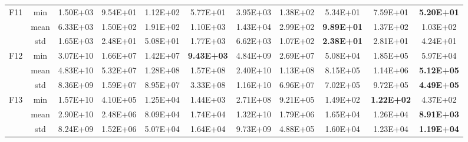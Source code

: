 \documentclass[preprint,review,compress,12pt]{elsarticle}
\begin{document}
\begin{table}[H]
{\begin{tabular}{ccccccccccc}
    \multirow{3}[0]{*}{F11} & min   & 1.50E+03 & 9.54E+01 & 1.12E+02 & 5.77E+01 & 3.95E+03 & 1.38E+02 & 5.34E+01 & 7.59E+01 & \textbf{5.20E+01} \\
          & mean  & 6.33E+03 & 1.50E+02 & 1.91E+02 & 1.10E+03 & 1.43E+04 & 2.99E+02 & \textbf{9.89E+01} & 1.37E+02 & 1.03E+02 \\
          & std   & 1.65E+03 & 2.48E+01 & 5.08E+01 & 1.77E+03 & 6.62E+03 & 1.07E+02 & \textbf{2.38E+01} & 2.81E+01 & 4.24E+01 \\
    \multirow{3}[0]{*}{F12} & min   & 3.07E+10 & 1.66E+07 & 1.42E+07 & \textbf{9.43E+03} & 4.84E+09 & 2.69E+07 & 5.08E+04 & 1.85E+05 & 5.97E+04 \\
          & mean  & 4.83E+10 & 5.32E+07 & 1.28E+08 & 1.57E+08 & 2.40E+10 & 1.13E+08 & 8.15E+05 & 1.14E+06 & \textbf{5.12E+05} \\
          & std   & 8.36E+09 & 1.59E+07 & 8.95E+07 & 3.33E+08 & 1.16E+10 & 6.96E+07 & 7.02E+05 & 9.72E+05 & \textbf{4.49E+05} \\
    \multirow{3}[0]{*}{F13} & min   & 1.57E+10 & 4.10E+05 & 1.25E+04 & 1.44E+03 & 2.71E+08 & 9.21E+05 & 1.49E+02 & \textbf{1.22E+02} & 4.37E+02 \\
          & mean  & 2.90E+10 & 2.48E+06 & 8.09E+04 & 1.74E+04 & 1.32E+10 & 1.79E+06 & 1.65E+04 & 1.26E+04 & \textbf{8.91E+03} \\
          & std   & 8.24E+09 & 1.52E+06 & 5.07E+04 & 1.64E+04 & 9.73E+09 & 4.88E+05 & 1.60E+04 & 1.23E+04 & \textbf{1.19E+04} \\
    \bottomrule
    \end{tabular}%
    }
  \label{tab:addlabel}%
\end{table}%
\end{document}
